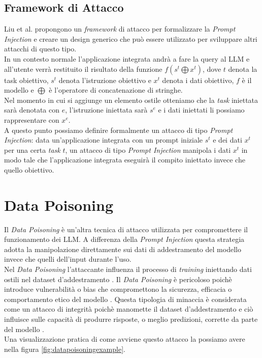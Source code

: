 \subsection{Framework di Attacco}
Liu et al. \cite{liu2024formalizingbenchmarkingpromptinjectionattacksdefenses} propongono un \emph{framework} di attacco per formalizzare la \emph{Prompt Injection} e creare un design generico che pu\`o essere utilizzato per sviluppare altri attacchi di questo tipo.\\
In un contesto normale l'applicazione integrata andr\`a a fare la query al LLM e all'utente verr\`a restituito il risultato della funzione \(f(s^t \bigoplus x^t)\), dove \(t\) denota la task obiettivo, \(s^t\) denota l'istruzione obiettivo e \(x^t\) denota i dati obiettivo, \(f\) \`e il modello e \(\bigoplus\) \`e l'operatore di concatenazione di stringhe.\\
Nel momento in cui si aggiunge un elemento ostile otteniamo che la \emph{task} iniettata sar\`a denotata con \(e\), l'istruzione iniettata sar\`a \(s^e\) e i dati iniettati li possiamo rappresentare con \(x^e\).\\
A questo punto possiamo definire formalmente un attacco di tipo \emph{Prompt Injection}: data un'applicazione integrata con un prompt iniziale \(s^t\) e dei dati \(x^t\) per una certa \emph{task} \(t\), un attacco di tipo \emph{Prompt Injection} manipola i dati \(x^t\) in modo tale che l'applicazione integrata eseguir\`a il compito iniettato invece che quello obiettivo.




\section{Data Poisoning}
Il \emph{Data Poisoning} \`e un'altra tecnica di attacco utilizzata per compromettere il funzionamento dei LLM. A differenza della \emph{Prompt Injection} questa strategia adotta la manipolazione direttamente sui dati di addestramento del modello invece che quelli dell'input durante l'uso.\\
Nel \emph{Data Poisoning} l'attaccante influenza il processo di \emph{training} iniettando dati ostili nel dataset d'addestramento \cite{YAO2024surveyonllmsecurityandprivacy}.
Il \emph{Data Poisoning} \`e pericoloso poich\`e introduce vulnerabilit\`a o bias che compromettono la sicurezza, efficacia o comportamento etico del modello \cite{owasp2024threatstierlist}.
Questa tipologia di minaccia \`e considerata come un attacco di integrit\`a poich\`e manomette il dataset d'addestramento e ci\`o influisce sulle capacit\`a di produrre risposte, o meglio predizioni, corrette da parte del modello \cite{cso2024howdatapoisoningattackscorruptmodels}.\\
Una visualizzazione pratica di come avviene questo attacco la possiamo avere nella figura \ref{fig:datapoisoningexample}.

